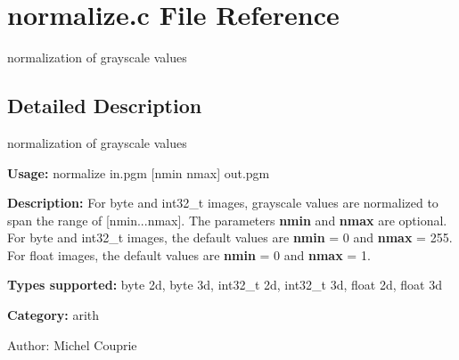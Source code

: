 \section{normalize.c File Reference}
\label{normalize_8c}
normalization of grayscale values  




\label{_details}
\subsection{Detailed Description}
normalization of grayscale values 

{\bf Usage:} normalize in.pgm [nmin nmax] out.pgm

{\bf Description:} For byte and int32\_\-t images, grayscale values are normalized to span the range of [nmin...nmax]. The parameters {\bf nmin} and {\bf nmax} are optional. For byte and int32\_\-t images, the default values are {\bf nmin} = 0 and {\bf nmax} = 255. For float images, the default values are {\bf nmin} = 0 and {\bf nmax} = 1.

{\bf Types supported:} byte 2d, byte 3d, int32\_\-t 2d, int32\_\-t 3d, float 2d, float 3d

{\bf Category:} arith

\begin{Desc}
\item[Author:]Michel Couprie \end{Desc}

